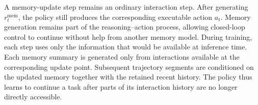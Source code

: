 A memory-update step remains an ordinary interaction step. After generating $r_t^{\mathrm{mem}}$, the policy still produces the corresponding executable action $a_t$. Memory generation remains part of the reasoning–action process, allowing closed-loop control to continue without help from another memory model. During training, each step uses only the information that would be available at inference time. Each memory summary is generated only from interactions available at the corresponding update point. Subsequent trajectory segments are conditioned on the updated memory together with the retained recent history. The policy thus learns to continue a task after parts of its interaction history are no longer directly accessible.
